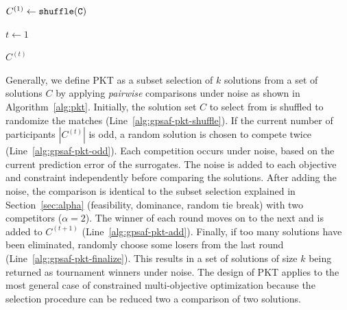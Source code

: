 \documentclass[journal]{IEEEtran}
\begin{document}
{\small
\begin{algorithm}[!t]

\vspace{1mm}

$C^{(1)} \gets \tt{shuffle}(C)$
\label{alg:gpsaf-pkt-shuffle}

$t \gets 1$



\Return $C^{(t)}$


\caption{Probabilistic Knockout Tournament (PKT)}
\label{alg:pkt}
\end{algorithm}}


Generally, we define PKT as a subset selection of $k$ solutions from a set of solutions $C$ by applying \emph{pairwise} comparisons under noise as shown in Algorithm~\ref{alg:pkt}.
Initially, the solution set $C$ to select from is shuffled to randomize the matches (Line~\ref{alg:gpsaf-pkt-shuffle}). If the current number of participants $|C^{(t)}|$ is odd, a random solution is chosen to compete twice (Line~\ref{alg:gpsaf-pkt-odd}).
Each competition occurs under noise, based on the current prediction error of the surrogates. The noise is added to each objective and constraint independently before comparing the solutions. After adding the noise, the comparison is identical to the subset selection explained in Section~\ref{sec:alpha} (feasibility, dominance, random tie break) with two competitors ($\alpha=2$). The winner of each round moves on to the next and is added to $C^{(t+1)}$ (Line~\ref{alg:gpsaf-pkt-add}).
Finally, if too many solutions have been eliminated, randomly choose some losers from the last round (Line~\ref{alg:gpsaf-pkt-finalize}). This results in a set of solutions of size $k$ being returned as tournament winners under noise.
The design of PKT applies to the most general case of constrained multi-objective optimization because the selection procedure can be reduced two a comparison of two solutions.
\end{document}
